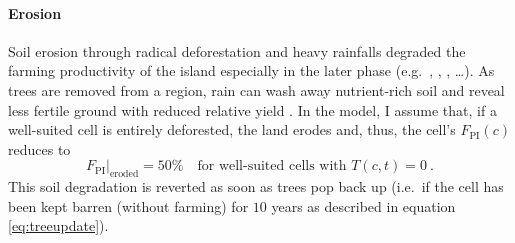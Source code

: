 
\paragraph{Erosion}
Soil erosion through radical deforestation and heavy rainfalls degraded the farming productivity of the island especially in the later phase (e.g.\ \citet{Brander1998}, \citet{Mieth2005}, \citet{Bahn2017}, \ldots).
As trees are removed from a region, rain can wash away nutrient-rich soil and reveal less fertile ground with reduced relative yield \citet{Mieth2005}.
In the model, I assume that, if a well-suited cell is entirely deforested, the land erodes and, thus, the cell's $F_\text{PI}(c)$ reduces to 
\begin{equation}
F_\text{PI}|_\text{eroded}=50\% \quad \text{for well-suited cells with } T(c,t)=0 \ .
\end{equation}
This soil degradation is reverted as soon as trees pop back up (i.e.\ if the cell has been kept barren (without farming) for $10$ years as described in equation \ref{eq:treeupdate}).


